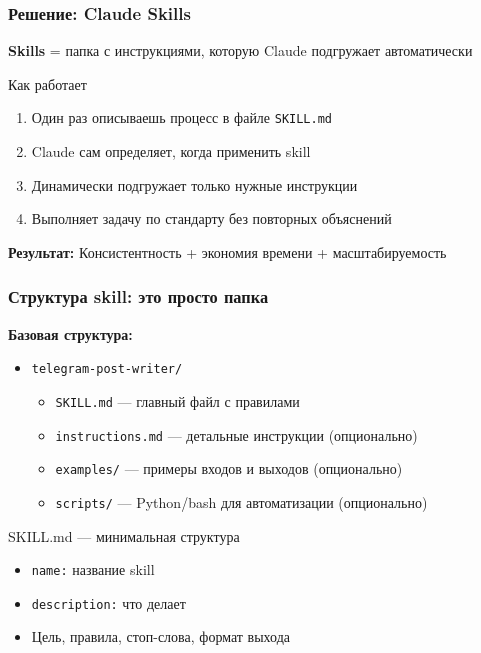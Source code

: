 \documentclass[aspectratio=169]{beamer}
\begin{document}
\begin{frame}
\frametitle{Решение: Claude Skills}

\textbf{Skills} = папка с инструкциями, которую Claude подгружает автоматически

\vspace{0.3cm}

\begin{block}{Как работает}
\begin{enumerate}
    \item Один раз описываешь процесс в файле \texttt{SKILL.md}
    \item Claude сам определяет, когда применить skill
    \item Динамически подгружает только нужные инструкции
    \item Выполняет задачу по стандарту без повторных объяснений
\end{enumerate}
\end{block}

\vspace{0.3cm}

\textbf{Результат:} Консистентность + экономия времени + масштабируемость

\end{frame}


\begin{frame}
\frametitle{Структура skill: это просто папка}

\textbf{Базовая структура:}

\vspace{0.3cm}

\begin{itemize}
    \item \texttt{telegram-post-writer/}
    \begin{itemize}
        \item \texttt{SKILL.md} — главный файл с правилами
        \item \texttt{instructions.md} — детальные инструкции (опционально)
        \item \texttt{examples/} — примеры входов и выходов (опционально)
        \item \texttt{scripts/} — Python/bash для автоматизации (опционально)
    \end{itemize}
\end{itemize}

\vspace{0.5cm}

\begin{block}{SKILL.md — минимальная структура}
\begin{itemize}
    \item \texttt{name:} название skill
    \item \texttt{description:} что делает
    \item Цель, правила, стоп-слова, формат выхода
\end{itemize}
\end{block}

\end{frame}
\end{document}
